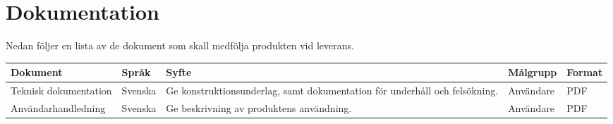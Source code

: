 \documentclass[kravspec/krav.tex]{subfiles}
\begin{document}
\section{Dokumentation}
\label{sec:doc}
Nedan följer en lista av de dokument som skall medfölja produkten vid leverans.
{\renewcommand{\arraystretch}{1.6}
\begin{longtable}{p{4.5cm}p{1.5cm}p{5cm}p{2cm}p{1.2cm}}
    \bfseries Dokument &
    \bfseries Språk &
    \bfseries Syfte &
    \bfseries Målgrupp &
    \bfseries Format \\\hline
    Teknisk dokumentation &
    Svenska &
    Ge konstruktionsunderlag, samt dokumentation för underhåll och
    felsökning. &
    Användare &
    PDF
    \\
    Användarhandledning &
    Svenska &
    Ge beskrivning av produktens användning. &
    Användare &
    PDF
    \endhead
\end{longtable}
}
\end{document}
